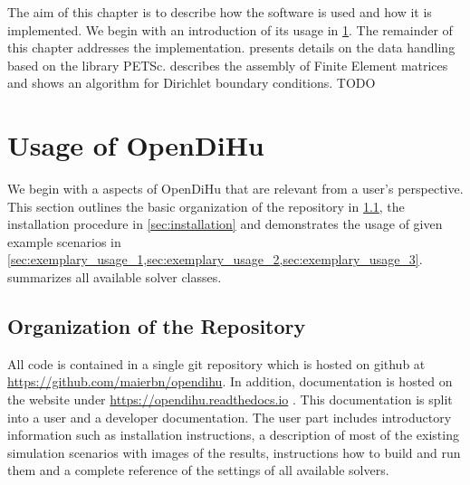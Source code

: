 The aim of this chapter is to describe how the software is used and how it is implemented. We begin with an introduction of its usage in \cref{sec:usage}. The remainder of this chapter addresses the implementation.  presents details on the data handling based on the library PETSc.  describes the assembly of Finite Element matrices and shows an algorithm for Dirichlet boundary conditions.  TODO

\section{Usage of OpenDiHu}\label{sec:usage}
We begin with a aspects of OpenDiHu that are relevant from a user's perspective. This section outlines the basic organization of the repository in \cref{sec:organization_of_the_directory}, the installation procedure in \cref{sec:installation} and demonstrates the usage of given example scenarios in \cref{sec:exemplary_usage_1,sec:exemplary_usage_2,sec:exemplary_usage_3}.  summarizes all available solver classes.

\subsection{Organization of the Repository}\label{sec:organization_of_the_directory}
All code is contained in a single git repository which is hosted on github at \url{https://github.com/maierbn/opendihu}. In addition, documentation is hosted on the  website under \url{https://opendihu.readthedocs.io} \cite{opendihuWeb}. This documentation is split into a user and a developer documentation. The user part includes introductory information such as installation instructions, a description of most of the existing simulation scenarios with images of the results, instructions how to build and run them and a complete reference of the settings of all available solvers.

